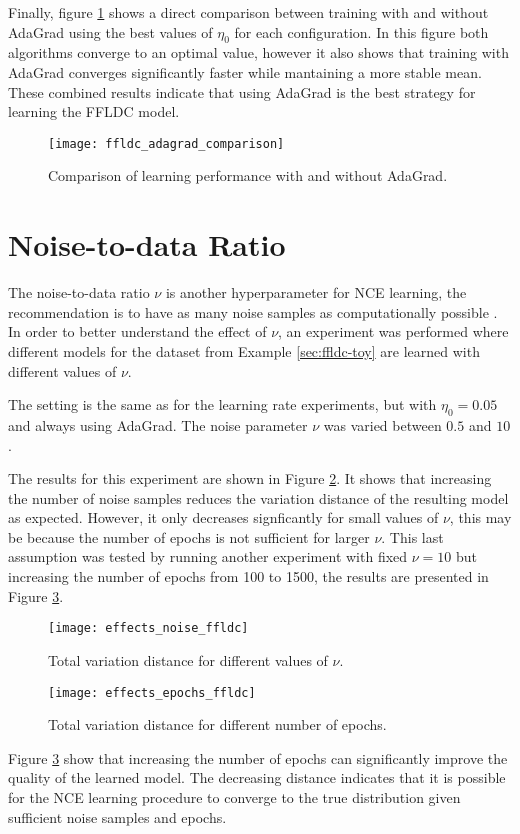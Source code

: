 Finally, figure \ref{fig:comparison_adagrad_ffldc_toy} shows a direct comparison between training with and without AdaGrad using the best values of $\eta_0$ for each configuration. In this figure both algorithms converge to an optimal value, however it also shows that training with AdaGrad converges significantly faster while mantaining a more stable mean. These combined results indicate that using AdaGrad is the best strategy for learning the FFLDC model.

\begin{figure}
  \centering
  \texttt{[image: ffldc\_adagrad\_comparison]}
  \caption{Comparison of learning performance with and without AdaGrad.}
  \label{fig:comparison_adagrad_ffldc_toy}
\end{figure}

\section{Noise-to-data Ratio}

The noise-to-data ratio $\nu$ is another hyperparameter for NCE learning, the recommendation is to have as many noise samples as computationally possible \citep{Gutmann12NCE}. In order to better understand the effect of $\nu$, an experiment was performed where different models for the dataset from Example \ref{sec:ffldc-toy} are learned with different values of $\nu$.

The setting is the same as for the learning rate experiments, but with $\eta_{0} = 0.05$ and always using AdaGrad. The noise parameter $\nu$ was varied between $0.5$ and $10$.

The results for this experiment are shown in Figure \ref{fig:effects_noise_ffldc}. It shows that increasing the number of noise samples reduces the variation distance of the resulting model as expected. However, it only decreases signficantly for small values of $\nu$, this may be because the number of epochs is not sufficient for larger $\nu$. This last assumption was tested by running another experiment with fixed $\nu = 10$ but increasing the number of epochs from 100 to 1500, the results are presented in Figure \ref{fig:effects_epochs_ffld}.

\begin{figure}
  \centering
  \texttt{[image: effects\_noise\_ffldc]}
  \caption{Total variation distance for different values of $\nu$.}
  \label{fig:effects_noise_ffldc}
\end{figure}

\begin{figure}
  \centering
  \texttt{[image: effects\_epochs\_ffldc]}
  \caption{Total variation distance for different number of epochs.}
  \label{fig:effects_epochs_ffld}
\end{figure}

Figure \ref{fig:effects_epochs_ffld} show that increasing the number of epochs can significantly improve the quality of the learned model. The decreasing distance indicates that it is possible for the NCE learning procedure to converge to the true distribution given sufficient noise samples and epochs.